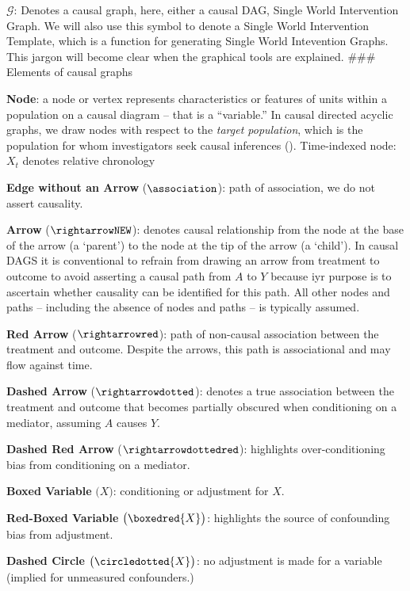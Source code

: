 \documentclass[
  single column]{article}
\begin{document}
\textbf{\(\mathcal{G}\)}: Denotes a causal graph, here, either a causal
DAG, Single World Intervention Graph. We will also use this symbol to
denote a Single World Intervention Template, which is a function for
generating Single World Intevention Graphs. This jargon will become
clear when the graphical tools are explained. \#\#\# Elements of causal
graphs

\textbf{Node}: a node or vertex represents characteristics or features
of units within a population on a causal diagram -- that is a
``variable.'' In causal directed acyclic graphs, we draw nodes with
respect to the \emph{target population}, which is the population for
whom investigators seek causal inferences
(). Time-indexed
node: \(X_t\) denotes relative chronology

\textbf{Edge without an Arrow} (\(\association\)): path of association,
we do not assert causality.

\textbf{Arrow} (\(\rightarrowNEW\)): denotes causal relationship from
the node at the base of the arrow (a `parent') to the node at the tip of
the arrow (a `child'). In causal DAGS it is conventional to refrain from
drawing an arrow from treatment to outcome to avoid asserting a causal
path from \(A\) to \(Y\) because iyr purpose is to ascertain whether
causality can be identified for this path. All other nodes and paths --
including the absence of nodes and paths -- is typically assumed.

\textbf{Red Arrow} (\(\rightarrowred\)): path of non-causal association
between the treatment and outcome. Despite the arrows, this path is
associational and may flow against time.

\textbf{Dashed Arrow} (\(\rightarrowdotted\)): denotes a true
association between the treatment and outcome that becomes partially
obscured when conditioning on a mediator, assuming \(A\) causes \(Y\).

\textbf{Dashed Red Arrow} (\(\rightarrowdottedred\)): highlights
over-conditioning bias from conditioning on a mediator.

\textbf{Boxed Variable} \(\big(\boxed{X}\big)\): conditioning or
adjustment for \(X\).

\textbf{Red-Boxed Variable} \(\big(\boxedred{X}\big)\): highlights the
source of confounding bias from adjustment.

\textbf{Dashed Circle} \(\big( \circledotted{X}\big)\): no adjustment is
made for a variable (implied for unmeasured confounders.)
\end{document}

